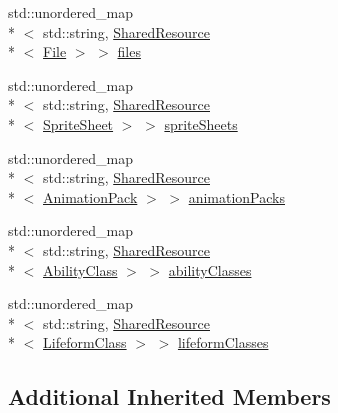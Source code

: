 \begin{DoxyCompactItemize}
\item 
std\+::unordered\+\_\+map\\*
$<$ std\+::string, \hyperlink{classZeta_1_1SharedResource}{Shared\+Resource}\\*
$<$ \hyperlink{classZeta_1_1File}{File} $>$ $>$ \hyperlink{classZeta_1_1SynchronousResourceContext_a5d64c2516174f662c56ab56132bb2260}{files}
\item 
std\+::unordered\+\_\+map\\*
$<$ std\+::string, \hyperlink{classZeta_1_1SharedResource}{Shared\+Resource}\\*
$<$ \hyperlink{classZeta_1_1SpriteSheet}{Sprite\+Sheet} $>$ $>$ \hyperlink{classZeta_1_1SynchronousResourceContext_a6039dc77546b72da03e229e2f1e48add}{sprite\+Sheets}
\item 
std\+::unordered\+\_\+map\\*
$<$ std\+::string, \hyperlink{classZeta_1_1SharedResource}{Shared\+Resource}\\*
$<$ \hyperlink{classZeta_1_1AnimationPack}{Animation\+Pack} $>$ $>$ \hyperlink{classZeta_1_1SynchronousResourceContext_a930d4937be63a59ffd6852085e864fc7}{animation\+Packs}
\item 
std\+::unordered\+\_\+map\\*
$<$ std\+::string, \hyperlink{classZeta_1_1SharedResource}{Shared\+Resource}\\*
$<$ \hyperlink{classZeta_1_1AbilityClass}{Ability\+Class} $>$ $>$ \hyperlink{classZeta_1_1SynchronousResourceContext_a4dd6ba3c7087214fbb1a9ee9ab5d1617}{ability\+Classes}
\item 
std\+::unordered\+\_\+map\\*
$<$ std\+::string, \hyperlink{classZeta_1_1SharedResource}{Shared\+Resource}\\*
$<$ \hyperlink{classZeta_1_1LifeformClass}{Lifeform\+Class} $>$ $>$ \hyperlink{classZeta_1_1SynchronousResourceContext_af6a05268e24c8652866d5c324e3b13df}{lifeform\+Classes}
\end{DoxyCompactItemize}
\subsection*{Additional Inherited Members}


